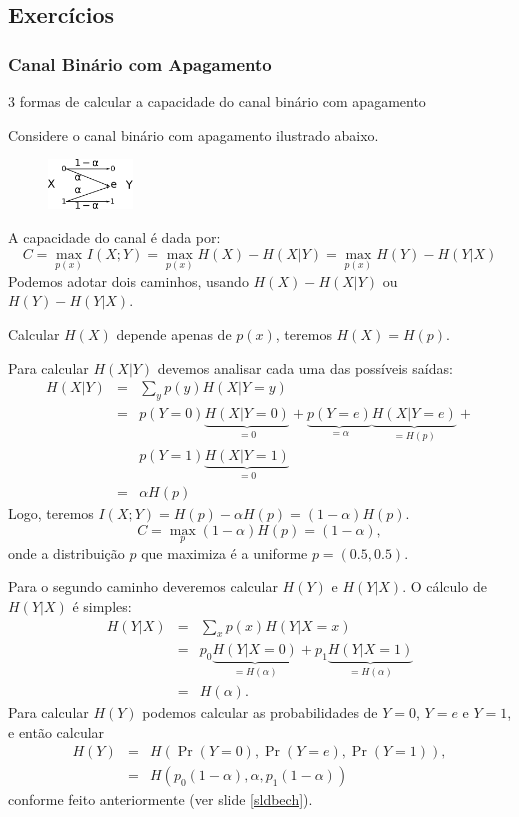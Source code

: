 \subsection{Exercícios}
\begin{frame}[allowframebreaks]
  \frametitle{Canal Binário com Apagamento}
  3 formas de calcular a capacidade do canal binário com apagamento
  \begin{exercise}
  Considere o canal binário com apagamento ilustrado abaixo.
      \begin{figure}[h!]
      \centering
      \includegraphics[width=0.2\textwidth]{images/bech.pdf}
      \label{fig:bechrev}
      \end{figure}
  A capacidade do canal é dada por:
  \begin{equation}
  C = \max_{p(x)} I(X;Y) = \max_{p(x)} H(X) - H(X|Y) = \max_{p(x)} H(Y) - H(Y|X)
  \end{equation}
  Podemos adotar dois caminhos, usando $H(X) - H(X|Y)$ ou $H(Y) - H(Y|X)$.
  
  \exercisebreak
  Calcular $H(X)$ depende apenas de $p(x)$, teremos $H(X) = H(p)$.

  Para calcular $H(X|Y)$ devemos analisar cada uma das possíveis saídas:
  \begin{eqnarray}
  H(X|Y) &=& \sum_y p(y) H(X|Y=y) \\
	&=& p(Y=0) \underbrace{H(X|Y=0)}_{=0} + \underbrace{p(Y=e)}_{=\alpha} \underbrace{H(X|Y=e)}_{=H(p)} + \nonumber \\
	&& p(Y=1) \underbrace{H(X|Y=1)}_{=0} \nonumber \\
	&=& \alpha H(p)
  \end{eqnarray}
  \exercisebreak
  Logo, teremos $I(X;Y) = H(p) - \alpha H(p) = (1-\alpha) H(p)$.
  \begin{equation}
  C = \max_{p} (1-\alpha) H(p) = (1-\alpha) ,
  \end{equation}
  onde a distribuição $p$ que maximiza é a uniforme $p = (0.5, 0.5)$.

  \exercisebreak
  Para o segundo caminho deveremos calcular $H(Y)$ e $H(Y|X)$.
  O cálculo de $H(Y|X)$ é simples:
  \begin{eqnarray}
  H(Y|X) &=& \sum_x p(x) H(Y|X=x) \nonumber \\
	&=& p_0 \underbrace{H(Y|X=0)}_{=H(\alpha)} + p_1 \underbrace{H(Y|X=1)}_{=H(\alpha)} \nonumber \\
	&=& H(\alpha) .
  \end{eqnarray}
  \exercisebreak
  Para calcular $H(Y)$ podemos calcular as probabilidades de $Y=0$, $Y=e$ e $Y=1$, e então calcular
  \begin{eqnarray} 
   H(Y) &=& H(\Pr(Y=0),\Pr(Y=e),\Pr(Y=1)) , \nonumber \\ 
        &=& H \left( p_0 (1-\alpha) , \alpha, p_1 (1-\alpha) \right)
  \end{eqnarray}
  conforme feito anteriormente (ver slide \ref{sldbech}).


\end{exercise}
\end{frame}

